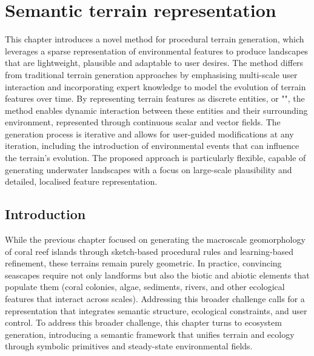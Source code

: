 \graphicspath{ {./Chapter 2/figures/} {./Chapter 2/figures/Snake/} {./Chapter 2/figures/Water/} {./Chapter 2/results/} }

\chapter{Semantic terrain representation}
\label{chap:semantic-representation}

\abstract
\label{chap:env-obj-abstract}
This chapter introduces a novel method for procedural terrain generation, which leverages a sparse representation of environmental features to produce landscapes that are lightweight, plausible and adaptable to user desires. The method differs from traditional terrain generation approaches by emphasising multi-scale user interaction and incorporating expert knowledge to model the evolution of terrain features over time. By representing terrain features as discrete entities, or "", the method enables dynamic interaction between these entities and their surrounding environment, represented through continuous scalar and vector fields. The generation process is iterative and allows for user-guided modifications at any iteration, including the introduction of environmental events that can influence the terrain's evolution. The proposed approach is particularly flexible, capable of generating underwater landscapes with a focus on large-scale plausibility and detailed, localised feature representation.
\pagebreak

\minitoc

\section{Introduction}
While the previous chapter focused on generating the macroscale geomorphology of coral reef islands through sketch-based procedural rules and learning-based refinement, these terrains remain purely geometric. In practice, convincing seascapes require not only landforms but also the biotic and abiotic elements that populate them (coral colonies, algae, sediments, rivers, and other ecological features that interact across scales). Addressing this broader challenge calls for a representation that integrates semantic structure, ecological constraints, and user control. To address this broader challenge, this chapter turns to ecosystem generation, introducing a semantic framework that unifies terrain and ecology through symbolic primitives and steady-state environmental fields.


